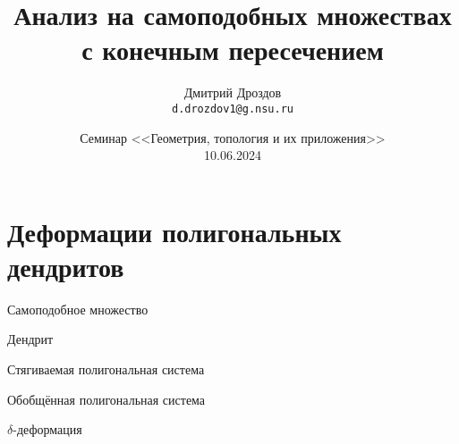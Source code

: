 \documentclass[aspectratio=1610, 10pt, notheorems]{beamer}
\title[Анализ на самоподобных множествах с конечным пересечением]
    {Анализ на самоподобных множествах с конечным пересечением}
\author[Dmitry Drozdov]
    {Дмитрий Дроздов \\ {\tt d.drozdov1@g.nsu.ru}}
\institute[ИМ СО РАН]{Институт математики имени С. Л. Соболева СО РАН}
\date[20.02.2024]
    {Семинар <<Геометрия, топология и их приложения>>\\10.06.2024}
\begin{document}
\begin{frame}{}
    \titlepage
\end{frame}


\section{Деформации полигональных дендритов}

\begin{frame}{Самоподобное множество}

\end{frame}


\begin{frame}{Дендрит}

\end{frame}


\begin{frame}{Стягиваемая полигональная система}

\end{frame}


\begin{frame}{Обобщённая полигональная система}

\end{frame}


\begin{frame}{$\delta$-деформация}

\end{frame}


\begin{frame}{}

\end{frame}


\begin{frame}{}

\end{frame}


\begin{frame}{}

\end{frame}


\begin{frame}{}

\end{frame}


\begin{frame}{}

\end{frame}


\begin{frame}{}

\end{frame}
\end{document}
